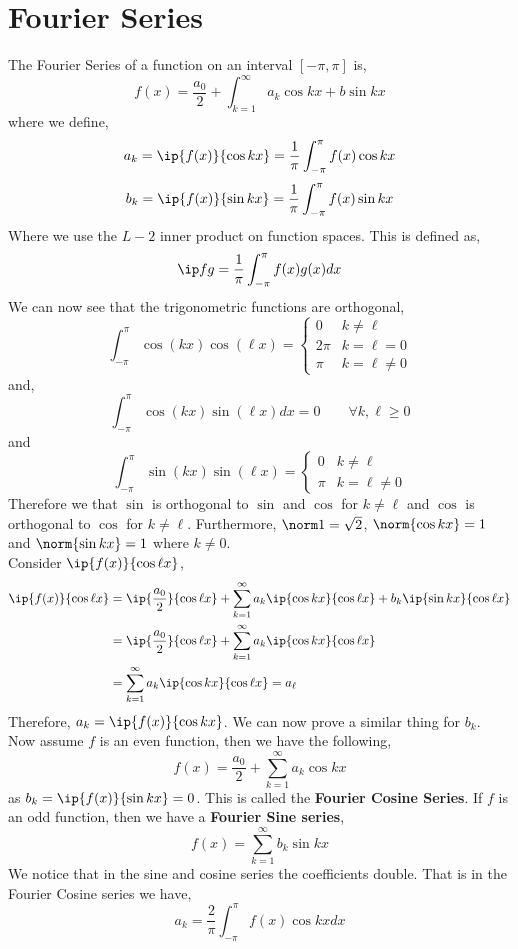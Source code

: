 \section{Fourier Series}
The Fourier Series of a function on an interval $[-\pi, \pi]$ is,
$$ f(x) = \frac{a_0}{2} + \int_{k=1}^\infty a_k\cos kx + b\sin kx $$
where we define,
$$ a_k = \ip{f(x)}{\cos kx} = \frac{1}{\pi}\int_{-\pi}^\pi f(x)\cos kx $$
$$ b_k = \ip{f(x)}{\sin kx} = \frac{1}{\pi}\int_{-\pi}^\pi f(x)\sin kx $$
Where we use the $L-2$ inner product on function spaces. This is defined as,
$$ \ip f g = \frac{1}{\pi}\int_{-\pi}^\pi f(x)g(x)dx $$
We can now see that the trigonometric functions are orthogonal,
$$ \int_{-\pi}^\pi \cos (kx)\cos (\ell x) = \begin{cases}
  0 & k \ne \ell \\
  2\pi & k = \ell = 0\\
  \pi & k = \ell \ne 0
\end{cases} $$
and,
$$ \int_{-\pi}^\pi \cos(kx)\sin(\ell x)dx = 0 \qquad \forall k, \ell \ge 0$$
and
$$ \int_{-\pi}^\pi \sin (kx)\sin(\ell x) = \begin{cases}
  0 & k \ne \ell \\
  \pi & k = \ell \ne 0
\end{cases} $$
Therefore we that $\sin$ is orthogonal to $\sin$ and $\cos$ for $k \ne \ell$ and $\cos$ is orthogonal to $\cos$ for $k \ne \ell$. Furthermore, $\norm 1 = \sqrt 2$, $\norm {\cos kx} = 1$ and $\norm {\sin kx} = 1$ where $k \ne 0$.\\


\noindent
Consider $\ip{f(x)}{\cos \ell x}$,
\begin{align*}
   \ip{f(x)}{\cos \ell x} &= \ip{\frac{a_0}{2}}{\cos \ell x} + \sum_{k=1}^\infty a_k \ip{\cos kx}{\cos \ell x} + b_k\ip{\sin kx}{\cos \ell x}\\
   &= \ip{\frac{a_0}{2}}{\cos \ell x} + \sum_{k=1}^\infty a_k \ip{\cos kx}{\cos \ell x} \\
   &= \sum_{k=1}^\infty a_k \ip{\cos kx}{\cos \ell x} = a_\ell \\
\end{align*}
Therefore, $a_k = \ip{f(x)}{\cos kx}$. We can now prove a similar thing for $b_k$. \\

\noindent
Now assume $f$ is an even function, then we have the following,
$$ f(x) = \frac{a_0}{2} + \sum_{k=1}^\infty a_k\cos kx $$
as $b_k = \ip{f(x)}{\sin kx} = 0$. This is called the \textbf{Fourier Cosine Series}. If $f$ is an odd function, then we have a \textbf{Fourier Sine series},
$$ f(x) = \sum_{k=1}^\infty b_k \sin kx$$
We notice that in the sine and cosine series the coefficients double. That is in the Fourier Cosine series we have,
$$ a_k = \frac{2}{\pi}\int_{-\pi}^\pi f(x)\cos kx dx $$


